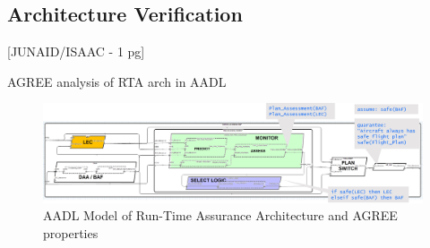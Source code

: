 \subsection{Architecture Verification}

[JUNAID/ISAAC - 1 pg]

AGREE analysis of RTA arch in AADL


\begin{figure}
	\centering
	\includegraphics[width=\textwidth]{figures/rta-agree.jpg}
	\caption{AADL Model of Run-Time Assurance Architecture and AGREE properties}
	\label{fig:rta-agree}
\end{figure}